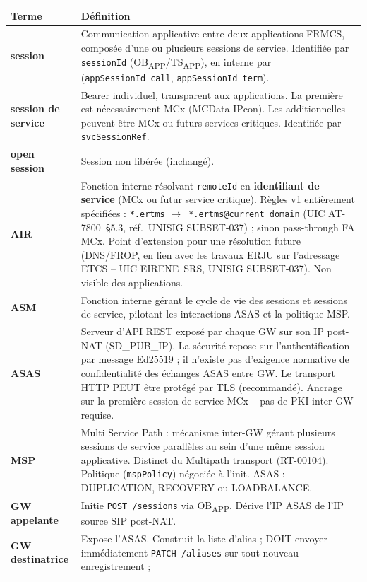 \documentclass[11pt,a4paper]{article}
\newcommand{\OBAPP}{OB\textsubscript{APP}}
\newcommand{\TSAPP}{TS\textsubscript{APP}}
\newcommand{\arr}{$\to$}
\newcommand{\svcref}{\texttt{svcSessionRef}}
\newcommand{\appcall}{\texttt{appSessionId\_call}}
\newcommand{\appterm}{\texttt{appSessionId\_term}}
\begin{document}
\begin{longtable}{>{\bfseries}p{3.8cm} p{10.5cm}}
  \toprule Terme & Définition \\ \midrule \endhead
  session & Communication applicative entre deux applications FRMCS, composée
    d'une ou plusieurs sessions de service. Identifiée par \texttt{sessionId}
    (\OBAPP/\TSAPP), en interne par (\appcall, \appterm). \\[0.3em]
  session de service & Bearer individuel, transparent aux applications.
    La première est nécessairement MCx (MCData IPcon). Les additionnelles
    peuvent être MCx ou futurs services critiques. Identifiée par \svcref. \\[0.3em]
  open session & Session non libérée (inchangé). \\[0.3em]
  AIR & Fonction interne résolvant \texttt{remoteId} en \textbf{identifiant de
    service} (MCx ou futur service critique). Règles v1 entièrement spécifiées :
    \texttt{*.ertms} \arr\ \texttt{*.ertms@current\_domain}
    (UIC AT-7800~§5.3, réf.\ UNISIG SUBSET-037) ;
    sinon pass-through FA MCx. Point d'extension pour une résolution future
    (DNS/FROP, en lien avec les travaux ERJU sur l'adressage ETCS --
    UIC EIRENE~SRS, UNISIG SUBSET-037). Non visible des applications. \\[0.3em]
  ASM & Fonction interne gérant le cycle de vie des sessions et sessions de
    service, pilotant les interactions ASAS et la politique MSP. \\[0.3em]
  ASAS & Serveur d'API REST exposé par chaque GW sur son IP post-NAT (SD\_PUB\_IP).
    La sécurité repose sur l'authentification par message Ed25519 ; il n'existe pas
    d'exigence normative de confidentialité des échanges ASAS entre GW. Le transport
    HTTP PEUT être protégé par TLS (recommandé). Ancrage sur la première session de
    service MCx -- pas de PKI inter-GW requise. \\[0.3em]
  MSP & Multi Service Path : mécanisme inter-GW gérant plusieurs sessions de service
    parallèles au sein d'une même session applicative. Distinct du Multipath transport
    (RT-00104). Politique (\texttt{mspPolicy}) négociée à l'init. ASAS :
    DUPLICATION, RECOVERY ou LOADBALANCE. \\[0.3em]
  GW appelante & Initie \texttt{POST /sessions} via \OBAPP.
    Dérive l'IP ASAS de l'IP source SIP post-NAT. \\[0.3em]
  GW destinatrice & Expose l'ASAS. Construit la liste d'alias ; DOIT envoyer
    immédiatement \texttt{PATCH /aliases} sur tout nouveau enregistrement ;

\end{longtable}
\end{document}
